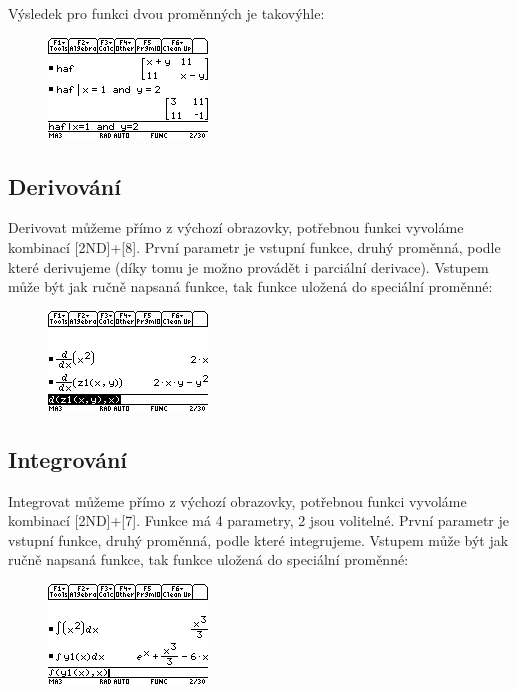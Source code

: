 \documentclass[10pt,a4paper,float]{article}
\begin{document}
Výsledek pro funkci dvou proměnných je takovýhle:

\begin{figure}[H]
	\centering
	\includegraphics[width=.5\textwidth]{img/UZITIMATIC3}
\end{figure}

\subsection{Derivování}
\label{ssec:derivace}
Derivovat můžeme přímo z výchozí obrazovky, potřebnou funkci vyvoláme kombinací [2ND]+[8]. První parametr je vstupní funkce, druhý proměnná, podle které derivujeme (díky tomu je možno provádět i parciální derivace). Vstupem může být jak ručně napsaná funkce, tak funkce uložená do speciální proměnné:

\begin{figure}[H]
	\centering
	\includegraphics[width=.5\textwidth]{img/DERIVACE}
\end{figure}

\pagebreak

\subsection{Integrování}
\label{ssec:integrace}
Integrovat můžeme přímo z výchozí obrazovky, potřebnou funkci vyvoláme kombinací [2ND]+[7]. Funkce má 4 parametry, 2 jsou volitelné. První parametr je vstupní funkce, druhý proměnná, podle které integrujeme. Vstupem může být jak ručně napsaná funkce, tak funkce uložená do speciální proměnné:

\begin{figure}[H]
	\centering
	\includegraphics[width=.5\textwidth]{img/INTEGROVANI1}
\end{figure}
\end{document}
